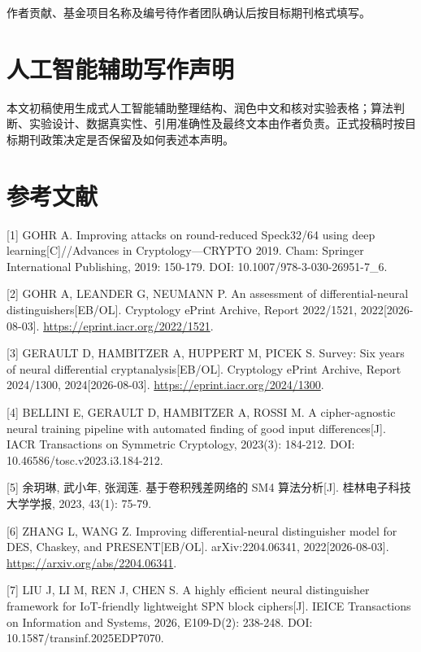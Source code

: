 \documentclass[
  a4paper,
  UTF8]{ctexart}
\begin{document}
作者贡献、基金项目名称及编号待作者团队确认后按目标期刊格式填写。

\hypertarget{ux4ebaux5de5ux667aux80fdux8f85ux52a9ux5199ux4f5cux58f0ux660e}{%
\section{人工智能辅助写作声明}\label{ux4ebaux5de5ux667aux80fdux8f85ux52a9ux5199ux4f5cux58f0ux660e}}

本文初稿使用生成式人工智能辅助整理结构、润色中文和核对实验表格；算法判断、实验设计、数据真实性、引用准确性及最终文本由作者负责。正式投稿时按目标期刊政策决定是否保留及如何表述本声明。

\hypertarget{ux53c2ux8003ux6587ux732e}{%
\section{参考文献}\label{ux53c2ux8003ux6587ux732e}}

{[}1{]} GOHR A. Improving attacks on round-reduced Speck32/64 using deep
learning{[}C{]}//Advances in Cryptology---CRYPTO 2019. Cham: Springer
International Publishing, 2019: 150-179. DOI:
10.1007/978-3-030-26951-7\_6.

{[}2{]} GOHR A, LEANDER G, NEUMANN P. An assessment of
differential-neural distinguishers{[}EB/OL{]}. Cryptology ePrint
Archive, Report 2022/1521, 2022{[}2026-08-03{]}.
\url{https://eprint.iacr.org/2022/1521}.

{[}3{]} GERAULT D, HAMBITZER A, HUPPERT M, PICEK S. Survey: Six years of
neural differential cryptanalysis{[}EB/OL{]}. Cryptology ePrint Archive,
Report 2024/1300, 2024{[}2026-08-03{]}.
\url{https://eprint.iacr.org/2024/1300}.

{[}4{]} BELLINI E, GERAULT D, HAMBITZER A, ROSSI M. A cipher-agnostic
neural training pipeline with automated finding of good input
differences{[}J{]}. IACR Transactions on Symmetric Cryptology, 2023(3):
184-212. DOI: 10.46586/tosc.v2023.i3.184-212.

{[}5{]} 余玥琳, 武小年, 张润莲. 基于卷积残差网络的 SM4 算法分析{[}J{]}.
桂林电子科技大学学报, 2023, 43(1): 75-79.

{[}6{]} ZHANG L, WANG Z. Improving differential-neural distinguisher
model for DES, Chaskey, and PRESENT{[}EB/OL{]}. arXiv:2204.06341,
2022{[}2026-08-03{]}. \url{https://arxiv.org/abs/2204.06341}.

{[}7{]} LIU J, LI M, REN J, CHEN S. A highly efficient neural
distinguisher framework for IoT-friendly lightweight SPN block
ciphers{[}J{]}. IEICE Transactions on Information and Systems, 2026,
E109-D(2): 238-248. DOI: 10.1587/transinf.2025EDP7070.
\end{document}
